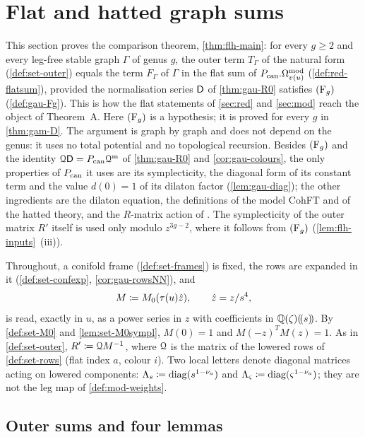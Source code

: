 \section{Flat and hatted graph sums}
\label{sec:flh}

This section proves the comparison theorem, \cref{thm:flh-main}: for every $g\geq 2$ and every leg-free stable graph $\Gamma$ of genus $g$, the outer term $T_\Gamma$ of the natural form (\cref{def:set-outer}) equals the term $F_\Gamma$ of $\Gamma$ in the flat sum of $P_{\mathrm{can}}.\Omega^{\mathrm{mod}}_{v(u)}$ (\cref{def:red-flatsum}), provided the normalisation series $\mathsf{D}$ of \cref{thm:gau-R0} satisfies $(\mathrm{F}_{g})$ (\cref{def:gau-Fg}). This is how the flat statements of \cref{sec:red} and \cref{sec:mod} reach the object of Theorem~A. Here $(\mathrm{F}_{g})$ is a hypothesis; it is proved for every $g$ in \cref{thm:gam-D}. The argument is graph by graph and does not depend on the genus: it uses no total potential and no topological recursion. Besides $(\mathrm{F}_{g})$ and the identity $\mathcal{Q}\mathsf{D}=P_{\mathrm{can}}\mathcal{Q}^{\mathrm m}$ of \cref{thm:gau-R0} and \cref{cor:gau-colours}, the only properties of $P_{\mathrm{can}}$ it uses are its symplecticity, the diagonal form of its constant term and the value $d(0)=1$ of its dilaton factor (\cref{lem:gau-diag}); the other ingredients are the dilaton equation, the definitions of the model CohFT and of the hatted theory, and the $R$-matrix action of \cite{PPZ15}. The symplecticity of the outer matrix $R'$ itself is used only modulo $z^{3g-2}$, where it follows from $(\mathrm{F}_{g})$ (\cref{lem:flh-inputs}~(iii)).

Throughout, a conifold frame (\cref{def:set-frames}) is fixed, the rows are expanded in it (\cref{def:set-confexp}, \cref{cor:gau-rowsNN}), and
\[
M\coloneqq M_{0}(\tau(u)\hat{z}),\qquad \hat{z}=z/s^4,
\]
is read, exactly in $u$, as a power series in $z$ with coefficients in $\mathbb{Q}(\zeta)(\!(s)\!)$. By \cref{def:set-M0} and \cref{lem:set-M0sympl}, $M(0)=1$ and $M(-z)^TM(z)=1$. As in \cref{def:set-outer}, $R'\coloneqq\mathcal{Q} M^{-1}$, where $\mathcal{Q}$ is the matrix of the lowered rows of \cref{def:set-rows} (flat index $a$, colour $i$). Two local letters denote diagonal matrices acting on lowered components: $\Lambda_s\coloneqq\operatorname{diag}(s^{1-\nu_a})$ and $\Lambda_\varsigma\coloneqq\operatorname{diag}(\varsigma^{1-\nu_a})$; they are not the leg map of \cref{def:mod-weights}.

\subsection{Outer sums and four lemmas}
\label{sec:flh-lemmas}

